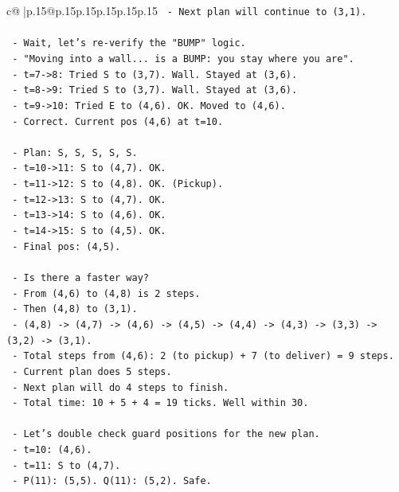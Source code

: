 \documentclass{article}
\begin{document}
{\begin{supertabular}{c@{$\;$}|p{.15\linewidth}@{}p{.15\linewidth}p{.15\linewidth}p{.15\linewidth}p{.15\linewidth}p{.15\linewidth}}
{{{\texttt{  {-} Next plan will continue to (3,1).} \\
\\ 
\texttt{  {-} Wait, let's re{-}verify the "BUMP" logic.} \\
\texttt{  {-} "Moving into a wall... is a BUMP: you stay where you are".} \\
\texttt{  {-} t=7{-}>8: Tried S to (3,7). Wall. Stayed at (3,6).} \\
\texttt{  {-} t=8{-}>9: Tried S to (3,7). Wall. Stayed at (3,6).} \\
\texttt{  {-} t=9{-}>10: Tried E to (4,6). OK. Moved to (4,6).} \\
\texttt{  {-} Correct. Current pos (4,6) at t=10.} \\
\\ 
\texttt{  {-} Plan: S, S, S, S, S.} \\
\texttt{  {-} t=10{-}>11: S to (4,7). OK.} \\
\texttt{  {-} t=11{-}>12: S to (4,8). OK. (Pickup).} \\
\texttt{  {-} t=12{-}>13: S to (4,7). OK.} \\
\texttt{  {-} t=13{-}>14: S to (4,6). OK.} \\
\texttt{  {-} t=14{-}>15: S to (4,5). OK.} \\
\texttt{  {-} Final pos: (4,5).} \\
\\ 
\texttt{  {-} Is there a faster way?} \\
\texttt{  {-} From (4,6) to (4,8) is 2 steps.} \\
\texttt{  {-} Then (4,8) to (3,1).} \\
\texttt{  {-} (4,8) {-}> (4,7) {-}> (4,6) {-}> (4,5) {-}> (4,4) {-}> (4,3) {-}> (3,3) {-}> (3,2) {-}> (3,1).} \\
\texttt{  {-} Total steps from (4,6): 2 (to pickup) + 7 (to deliver) = 9 steps.} \\
\texttt{  {-} Current plan does 5 steps.} \\
\texttt{  {-} Next plan will do 4 steps to finish.} \\
\texttt{  {-} Total time: 10 + 5 + 4 = 19 ticks. Well within 30.} \\
\\ 
\texttt{  {-} Let's double check guard positions for the new plan.} \\
\texttt{  {-} t=10: (4,6).} \\
\texttt{  {-} t=11: S to (4,7).} \\
\texttt{    {-} P(11): (5,5). Q(11): (5,2). Safe.} \\
}}}
\end{supertabular}}
\end{document}
